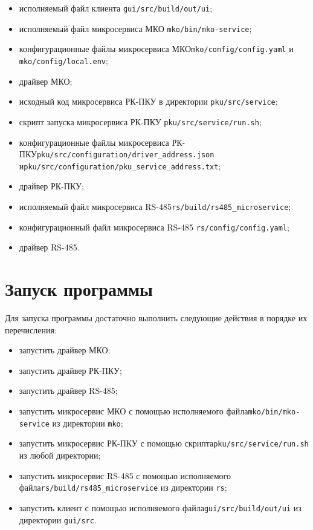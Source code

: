 \documentclass[a4paper, 14pt]{extreport}
\begin{document}
	\begin{itemize}
		\item исполняемый файл клиента \texttt{gui/src/build/out/ui};
		\item исполняемый файл микросервиса МКО \texttt{mko/bin/mko-service};
		\item конфигурационные файлы микросервиса МКО\linebreak\texttt{mko/config/config.yaml} и \texttt{mko/config/local.env};
		\item драйвер МКО;
		\item исходный код микросервиса РК-ПКУ в директории \texttt{pku/src/service};
		\item скрипт запуска микросервиса РК-ПКУ \texttt{pku/src/service/run.sh};
		\item конфигурационные файлы микросервиса РК-ПКУ\linebreak\texttt{pku/src/configuration/driver\_address.json} и\linebreak\texttt{pku/src/configuration/pku\_service\_address.txt};
		\item драйвер РК-ПКУ;
		\item исполняемый файл микросервиса RS-485\linebreak\texttt{rs/build/rs485\_microservice};
		\item конфигурационный файл микросервиса RS-485 \texttt{rs/config/config.yaml};
		\item драйвер RS-485.
	\end{itemize}

	\section{Запуск программы}

	Для запуска программы достаточно выполнить следующие действия в порядке их перечисления:
	
	\begin{itemize}
		\item запустить драйвер МКО;
		\item запустить драйвер РК-ПКУ;
		\item запустить драйвер RS-485;
		\item запустить микросервис МКО с помощью исполняемого файла\linebreak\texttt{mko/bin/mko-service} из директории \texttt{mko};
		\item запустить микросервис РК-ПКУ с помощью скрипта\linebreak\texttt{pku/src/service/run.sh} из любой директории;
		\item запустить микросервис RS-485 с помощью исполняемого файла\linebreak\texttt{rs/build/rs485\_microservice} из директории \texttt{rs};
		\item запустить клиент с помощью исполняемого файла\linebreak\texttt{gui/src/build/out/ui} из директории \texttt{gui/src}.
	\end{itemize}
\end{document}
